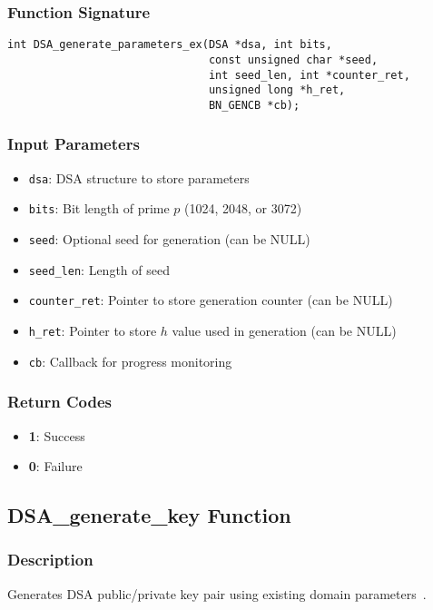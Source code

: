 \subsubsection{Function Signature}
\begin{verbatim}
int DSA_generate_parameters_ex(DSA *dsa, int bits,
                               const unsigned char *seed,
                               int seed_len, int *counter_ret,
                               unsigned long *h_ret,
                               BN_GENCB *cb);
\end{verbatim}

\subsubsection{Input Parameters}
\begin{itemize}
    \item \texttt{dsa}: DSA structure to store parameters
    \item \texttt{bits}: Bit length of prime $p$ (1024, 2048, or 3072)
    \item \texttt{seed}: Optional seed for generation (can be NULL)
    \item \texttt{seed\_len}: Length of seed
    \item \texttt{counter\_ret}: Pointer to store generation counter (can be NULL)
    \item \texttt{h\_ret}: Pointer to store $h$ value used in generation (can be NULL)
    \item \texttt{cb}: Callback for progress monitoring
\end{itemize}

\subsubsection{Return Codes}
\begin{itemize}
    \item \textbf{1}: Success
    \item \textbf{0}: Failure
\end{itemize}

\subsection{DSA\_generate\_key Function}

\subsubsection{Description}
Generates DSA public/private key pair using existing domain parameters~\cite{fips186}.

